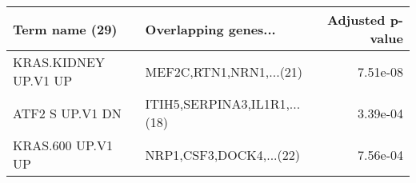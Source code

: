 \begin{tabular}{llr}
\toprule
      Term name (29) &         Overlapping genes... &  Adjusted p-value \\
\midrule
KRAS.KIDNEY UP.V1 UP &      MEF2C,RTN1,NRN1,...(21) &          7.51e-08 \\
     ATF2 S UP.V1 DN & ITIH5,SERPINA3,IL1R1,...(18) &          3.39e-04 \\
   KRAS.600 UP.V1 UP &      NRP1,CSF3,DOCK4,...(22) &          7.56e-04 \\
\bottomrule
\end{tabular}

